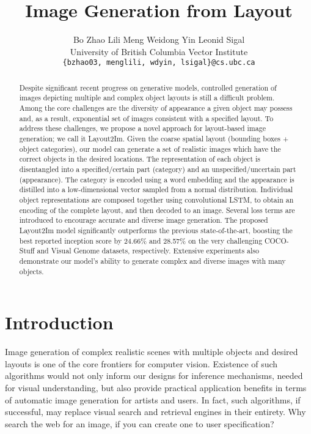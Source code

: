 \documentclass[10pt,twocolumn,letterpaper]{article}
\begin{document}
\title{Image Generation from Layout}


\author{Bo Zhao \quad \quad Lili Meng \quad \quad Weidong Yin \quad \quad Leonid Sigal\\
University of British Columbia  \quad Vector Institute\\
{\tt\small \{bzhao03, menglili, wdyin, lsigal\}@cs.ubc.ca}
}

\maketitle

\begin{abstract}
Despite significant recent progress on generative models, controlled generation of images depicting multiple and complex object layouts is still a difficult problem. 
Among the core challenges are the diversity of appearance a given object may possess and, as a result, exponential set of images consistent with a specified layout. 
To address these challenges, we propose a novel approach for layout-based image generation; we call it Layout2Im.
Given the coarse spatial layout (bounding boxes + object categories), our model can generate a set of realistic images which have the correct objects in the desired locations.
The representation of each object is disentangled into a specified/certain part (category) and an unspecified/uncertain part (appearance).
The category is encoded using a word embedding and the appearance is distilled into a low-dimensional vector sampled from a normal distribution.  
Individual object representations are composed together using convolutional LSTM, to obtain an encoding of the complete layout, and then decoded to an image.  
Several loss terms are introduced to encourage accurate and diverse image generation. 
The proposed Layout2Im model significantly outperforms the previous state-of-the-art, boosting the best reported inception score by 24.66\% and 28.57\% on the very challenging COCO-Stuff and Visual Genome datasets, respectively.
Extensive experiments also demonstrate our model's ability to generate complex and diverse images with many objects.


\end{abstract}

\section{Introduction}

Image generation of complex realistic scenes with multiple objects and desired layouts is one of the core frontiers for computer vision. Existence of such algorithms would not only inform our designs for inference mechanisms, needed for visual understanding, but also provide practical application benefits in terms of automatic image generation for artists and users. In fact, such algorithms, if successful, may replace visual search and retrieval engines in their entirety. Why search the web for an image, if you can create one to user specification? 
\end{document}
